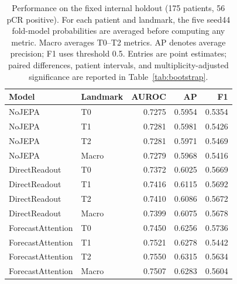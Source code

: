 \begin{table}[t]
\centering
\small
\caption{Performance on the fixed internal holdout (175 patients, 56 pCR positive). For each patient and landmark, the five seed44 fold-model probabilities are averaged before computing any metric. Macro averages T0--T2 metrics. AP denotes average precision; F1 uses threshold 0.5. Entries are point estimates; paired differences, patient intervals, and multiplicity-adjusted significance are reported in Table~\ref{tab:bootstrap}.}
\label{tab:main}
\begin{tabular}{llrrr}
\toprule
Model & Landmark & AUROC & AP & F1 \\
\midrule
NoJEPA & T0 & 0.7275 & 0.5954 & 0.5354 \\
NoJEPA & T1 & 0.7281 & 0.5981 & 0.5426 \\
NoJEPA & T2 & 0.7281 & 0.5971 & 0.5469 \\
NoJEPA & Macro & 0.7279 & 0.5968 & 0.5416 \\
DirectReadout & T0 & 0.7372 & 0.6025 & 0.5669 \\
DirectReadout & T1 & 0.7416 & 0.6115 & 0.5692 \\
DirectReadout & T2 & 0.7410 & 0.6086 & 0.5672 \\
DirectReadout & Macro & 0.7399 & 0.6075 & 0.5678 \\
ForecastAttention & T0 & 0.7450 & 0.6256 & 0.5736 \\
ForecastAttention & T1 & 0.7521 & 0.6278 & 0.5442 \\
ForecastAttention & T2 & 0.7550 & 0.6315 & 0.5634 \\
ForecastAttention & Macro & 0.7507 & 0.6283 & 0.5604 \\
\bottomrule
\end{tabular}
\end{table}

